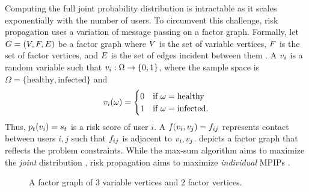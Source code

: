 Computing the full joint probability distribution is intractable as it scales exponentially with the number of users. To circumvent this challenge, risk propagation uses a variation of message passing on a factor graph. Formally, let $G = (V, F, E)$ be a factor graph where $V$ is the set of variable vertices, $F$ is the set of factor vertices, and $E$ is the set of edges incident between them \cite{Kschischang2001}. A  $v_{i}$ is a random variable such that $v_{i}: \Omega \rightarrow \{0, 1\}$, where the sample space is $\Omega = \{\text{healthy}, \text{infected}\}$ and
%
\begin{equation*}
    v_{i}(\omega) =
        \begin{cases}
            0 & \text{if $\omega = \text{healthy}$} \\
            1 & \text{if $\omega = \text{infected}$.}
        \end{cases}
\end{equation*}
%
Thus, $p_t(v_{i}) = s_t$ is a risk score of user $i$. A  $f_{}{}(v_{i}, v_{j}) = f_{ij}$ represents contact between users $i, j$ such that $f_{ij}$ is adjacent to $v_{i}, v_{j}$.  depicts a factor graph that reflects the problem constraints. 
While the max-sum algorithm aims to maximize the \emph{joint} distribution \cite[pp. 411--415]{Bishop2006}, risk propagation aims to maximize \emph{individual} MPIPs \cite{Ayday2021}.
%
\begin{figure}[htbp]
    \centering
    \caption[Factor graph]{A factor graph of 3 variable vertices and 2 factor vertices.}
    \label{fig:factor-graph}
\end{figure}
